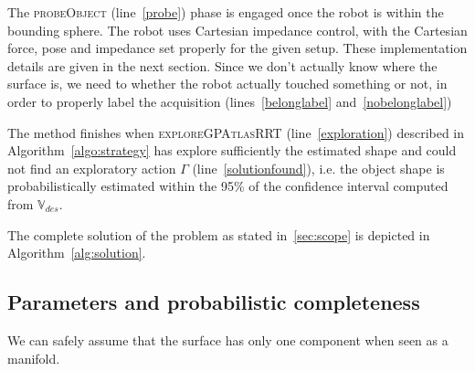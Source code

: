 The \textsc{probeObject} (line~\ref{probe}) phase is engaged once the robot is within the bounding sphere. The robot uses Cartesian impedance control, with the Cartesian force, pose and impedance set properly for the given setup. These implementation details are given in the next section. Since we don't actually know where the surface is, we need to whether the robot actually touched something or not, in order to properly label the acquisition (lines~\ref{belonglabel} and~\ref{nobelonglabel}) 

The method finishes when \textsc{exploreGPAtlasRRT} (line~\ref{exploration}) described in Algorithm~\ref{algo:strategy} has explore sufficiently the estimated shape and could not find an exploratory action $\Gamma$ (line~\ref{solutionfound}), i.e. the object shape is probabilistically estimated within the 95\% of the confidence interval computed from $\mathbb{V}_{des}$. 

The complete solution of the problem as stated in~\ref{sec:scope} is depicted in Algorithm~\ref{alg:solution}.

\subsection{Parameters  and probabilistic completeness}
\label{sec:analsys}

We can safely assume that the surface has only one component when seen as a manifold.
